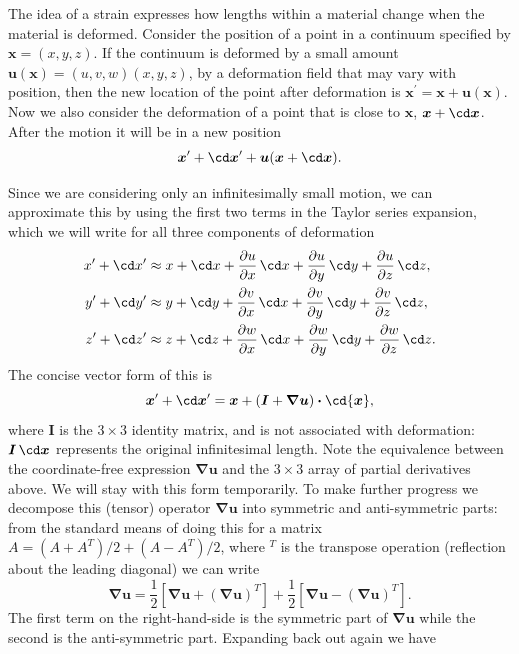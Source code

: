 \documentclass[twoside,11pt]		{report}
\begin{document}
The idea of a strain expresses how lengths within a material change
when the material is deformed. Consider the position of a point in a
continuum specified by $\bm{x}=(x, y, z)$. If the continuum is
deformed by a small amount $\bm{u}(\bm{x})=(u, v, w)(x, y, z)$, \ie by
a deformation field that may vary with position, then the new location
of the point after deformation is
$\bm{x}^\prime=\bm{x}+\bm{u}(\bm{x})$. Now we also consider the
deformation of a point that is close to $\bm{x}$, \ie
$\bm{x}+\cd\bm{x}$. After the motion it will be in a new position
\[
\bm{x}^\prime + \cd\bm{x}^\prime + \bm{u}(\bm{x}+\cd\bm{x}).
\]

Since we are considering only an infinitesimally small motion, we can
approximate this by using the first two terms in the Taylor series
expansion, which we will write for all three components of deformation
\begin{align*}
x^\prime + \cd x^\prime & \approx x +\cd x +
 \frac{\partial u}{\partial x}\,\cd x +
 \frac{\partial u}{\partial y}\,\cd y +
 \frac{\partial u}{\partial z}\,\cd z,\\
y^\prime + \cd y^\prime & \approx y +\cd y +
 \frac{\partial v}{\partial x}\,\cd x +
 \frac{\partial v}{\partial y}\,\cd y +
 \frac{\partial v}{\partial z}\,\cd z,\\
z^\prime + \cd z^\prime & \approx z +\cd z +
 \frac{\partial w}{\partial x}\,\cd x +
 \frac{\partial w}{\partial y}\,\cd y +
 \frac{\partial w}{\partial z}\,\cd z.
\end{align*}
The concise vector form of this is
\[
\bm{x}^\prime + \cd\bm{x}^\prime=
\bm{x}+(\bm{I}+\bm{\nabla u})\bm{\cdot}\cd{\bm{x}},
\]
where $\bm{I}$ is the $3\times3$ identity matrix, and is not
associated with deformation: $\bm{I}\,\cd\bm{x}$ represents the
original infinitesimal length. Note the equivalence between the
coordinate-free expression $\bm{\nabla u}$ and the $3\times3$ array of
partial derivatives above. We will stay with this form temporarily. To
make further progress we decompose this (tensor) operator $\bm{\nabla
u}$ into symmetric and anti-symmetric parts: from the standard means
of doing this for a matrix $A=(A+A^T)/2+(A-A^T)/2$, where $^T$ is the
transpose operation (reflection about the leading diagonal) we can
write
\[
\bm{\nabla u} =
 \frac{1}{2}\left[\bm{\nabla u}+(\bm{\nabla u})^T\right]+
 \frac{1}{2}\left[\bm{\nabla u}-(\bm{\nabla u})^T\right].
\]
The first term on the right-hand-side is the symmetric part of
$\bm{\nabla u}$ while the second is the anti-symmetric part. Expanding
back out again we have 
\end{document}
